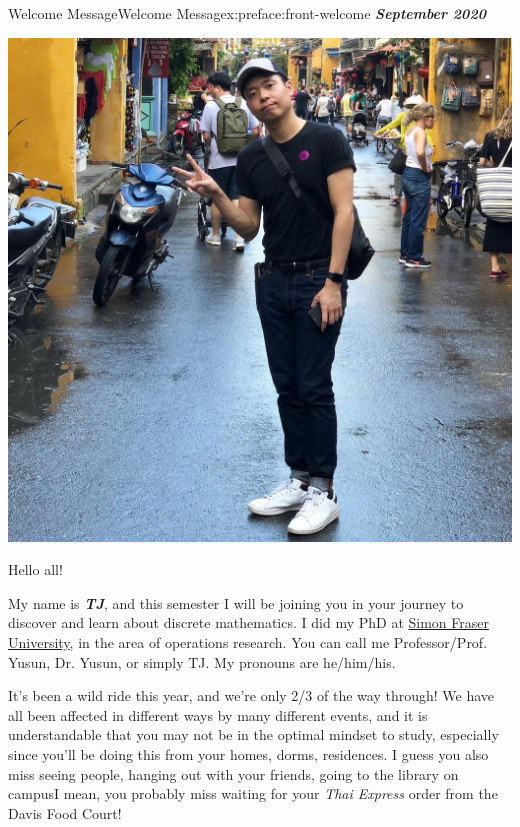 \documentclass[oneside,10pt,]{book}
\newcommand{\alert}[1]{\textbf{\textit{#1}}}
\numberwithin{equation}{section}
\begin{document}
\par\medskip
{}
\null\clearpage
%
%
\typeout{************************************************}
\typeout{************************************************}
%
\begin{preface}{Welcome Message}{}{Welcome Message}{}{}{x:preface:front-welcome}
\alert{September 2020}%
\begin{sidebyside}{1}{0.15}{0.15}{0}%
\begin{sbspanel}{0.7}%
\includegraphics[width=\linewidth]{figs/TJ.jpg}
\end{sbspanel}%
\end{sidebyside}%
\par
Hello all!%
\par
My name is \alert{TJ}, and this semester I will be joining you in your journey to discover and learn about discrete mathematics. I did my PhD at \href{https://sfu.ca}{Simon Fraser University}, in the area of operations research. You can call me Professor\slash{}Prof. Yusun, Dr. Yusun, or simply TJ. My pronouns are he\slash{}him\slash{}his.%
\par
It's been a wild ride this year, and we're only 2\slash{}3 of the way through! We have all been affected in different ways by many different events, and it is understandable that you may not be in the optimal mindset to study, especially since you'll be doing this from your homes, dorms, residences. I guess you also miss seeing people, hanging out with your friends, going to the library on campus\textellipsis{}I mean, you probably miss waiting for your \emph{Thai Express} order from the Davis Food Court!%

\end{preface}
\end{document}
